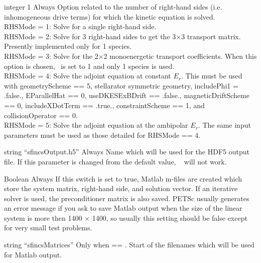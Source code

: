 {integer}
{1}
{Always}
{Option related to the number of right-hand sides (i.e. inhomogeneous drive terms) for which the kinetic equation is solved.\\

{\ttfamily RHSMode} = 1: Solve for a single right-hand side.\\

{\ttfamily RHSMode} = 2: Solve for 3 right-hand sides to get the 3$\times$3 transport matrix. Presently implemented only for 1 species.\\

{\ttfamily RHSMode} = 3: Solve for the 2$\times$2 monoenergetic transport coefficients. When this option is chosen, \Nx~is set to 1 and only 1 species is used. \\

{\ttfamily RHSMode} = 4: Solve the adjoint equation at constant $E_r$. This must be used with {\ttfamily geometryScheme == 5}, stellarator symmetric geometry, {\ttfamily includePhi1 = .false.}, {\ttfamily EParallelHat == 0}, {\ttfamily useDKESExBDrift == .false.}, {\ttfamily magneticDriftScheme == 0}, {\ttfamily includeXDotTerm == .true.}, {\ttfamily constraintScheme == 1}, and {\ttfamily collisionOperator == 0}. \\

{\ttfamily RHSMode} = 5: Solve the adjoint equation at the ambipolar $E_r$. The same input parameters must be used as those detailed for {\ttfamily RHSMode == 4}. 
}

\myhrule

{string}
{``sfincsOutput.h5''}
{Always}
{Name which will be used for the HDF5 output file.  If this parameter is changed from the default value, \sfincsScan~ will not work.}

\myhrule

{Boolean}
{\false}
{Always}
{If this switch is set to true, Matlab m-files are created which
 store the system matrix, right-hand side, and solution vector.  If an iterative solver is used,
 the preconditioner matrix is also saved.
 PETSc usually generates an error message if you ask to save Matlab output when
the size of the linear system is more then 1400 $\times$ 1400,
 so usually this setting should be false except for very small test problems.
}

\myhrule

{string}
{``sfincsMatrices''}
{Only when  == \true.}
{Start of the filenames which will be used for Matlab output.}

